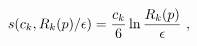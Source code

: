 \begin{equation}\label{2.24a}
s(c_k,R_k(p)/\epsilon)={c_k \over 6} \ln {R_k(p) \over \epsilon}~,
\end{equation}

